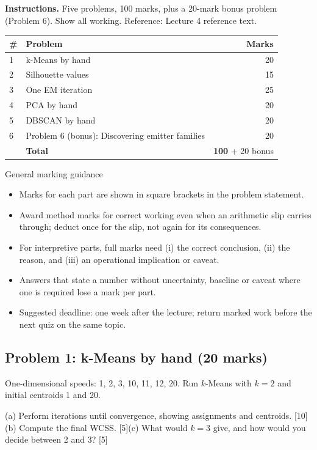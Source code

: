 \documentclass[11pt]{article}
\begin{document}
\textbf{Instructions.} Five problems, 100 marks, plus a 20-mark bonus problem (Problem 6). Show all working. Reference: Lecture 4 reference text.

\begin{center}\small\renewcommand{\arraystretch}{1.25}\begin{tabularx}{0.85\textwidth}{@{}l X r@{}}\toprule\textbf{\#} & \textbf{Problem} & \textbf{Marks}\\\midrule1 & k-Means by hand & 20\\
2 & Silhouette values & 15\\
3 & One EM iteration & 25\\
4 & PCA by hand & 20\\
5 & DBSCAN by hand & 20\\
6 & Problem 6 (bonus): Discovering emitter families & 20\\\midrule & \textbf{Total} & \textbf{100} + 20 bonus\\\bottomrule\end{tabularx}\end{center}

\begin{instr}{General marking guidance}\begin{itemize}
\item Marks for each part are shown in square brackets in the problem statement.
\item Award method marks for correct working even when an arithmetic slip carries through; deduct once for the slip, not again for its consequences.
\item For interpretive parts, full marks need (i) the correct conclusion, (ii) the reason, and (iii) an operational implication or caveat.
\item Answers that state a number without uncertainty, baseline or caveat where one is required lose a mark per part.
\item Suggested deadline: one week after the lecture; return marked work before the next quiz on the same topic.
\end{itemize}\end{instr}

\subsection{Problem 1: k-Means by hand \normalfont\small\color{GreyN}(20 marks)}

\begin{prob}One-dimensional speeds: 1, 2, 3, 10, 11, 12, 20. Run $k$-Means with $k=2$ and initial centroids 1 and 20.

(a) Perform iterations until convergence, showing assignments and centroids. [10]\newline (b) Compute the final WCSS. [5]\newline (c) What would $k=3$ give, and how would you decide between 2 and 3? [5]\end{prob}
\end{document}
